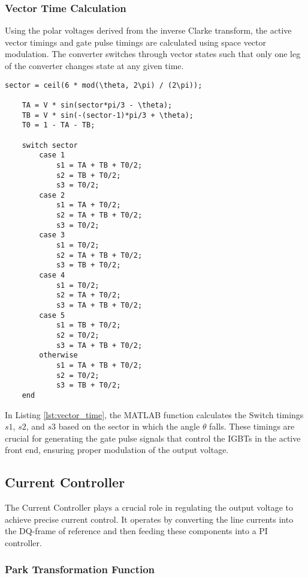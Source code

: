 \subsubsection{Vector Time Calculation}
Using the polar voltages derived from the inverse Clarke transform, the active
vector timings and gate pulse timings are calculated using space vector
modulation. The converter switches through vector states such that only one leg
of the converter changes state at any given time.

\begin{lstlisting}[style=MATLAB, caption={Vector Time Calculation}, label={lst:vector_time}]
    sector = ceil(6 * mod(\theta, 2\pi) / (2\pi));

    TA = V * sin(sector*pi/3 - \theta);
    TB = V * sin(-(sector-1)*pi/3 + \theta);
    T0 = 1 - TA - TB;

    switch sector 
        case 1 
            s1 = TA + TB + T0/2; 
            s2 = TB + T0/2; 
            s3 = T0/2; 
        case 2 
            s1 = TA + T0/2; 
            s2 = TA + TB + T0/2; 
            s3 = T0/2; 
        case 3 
            s1 = T0/2; 
            s2 = TA + TB + T0/2; 
            s3 = TB + T0/2; 
        case 4 
            s1 = T0/2; 
            s2 = TA + T0/2; 
            s3 = TA + TB + T0/2; 
        case 5 
            s1 = TB + T0/2; 
            s2 = T0/2; 
            s3 = TA + TB + T0/2; 
        otherwise 
            s1 = TA + TB + T0/2; 
            s2 = T0/2; 
            s3 = TB + T0/2; 
    end
\end{lstlisting}

In Listing \ref{lst:vector_time}, the MATLAB function calculates the Switch
timings \( s1 \), \( s2 \), and \( s3 \) based on the sector in which the angle
\( \theta \) falls. These timings are crucial for generating the gate pulse
signals that control the IGBTs in the active front end, ensuring proper
modulation of the output voltage.

\subsection{Current Controller}

The Current Controller plays a crucial role in regulating the output voltage to
achieve precise current control. It operates by converting the line currents
into the DQ-frame of reference and then feeding these components into a PI
controller.

\subsubsection{Park Transformation Function}

